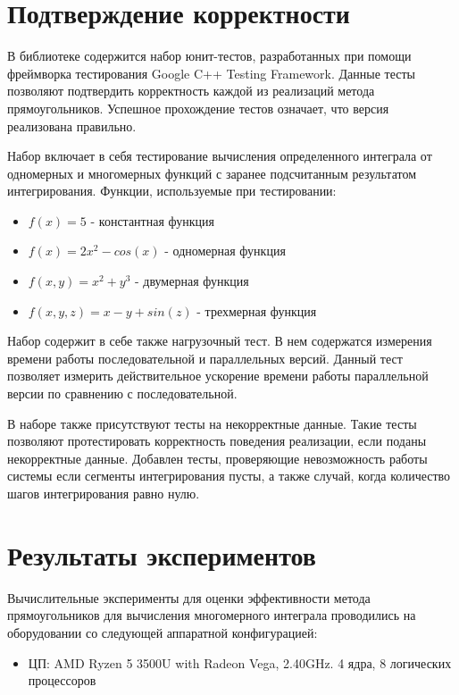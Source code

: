 \documentclass{report}
\begin{document}
\section*{Подтверждение корректности}
В библиотеке содержится набор юнит-тестов, разработанных при помощи фреймворка тестирования Google C++ Testing Framework. Данные тесты позволяют подтвердить корректность каждой из реализаций метода прямоугольников. Успешное прохождение тестов означает, что версия реализована правильно.
\par Набор включает в себя тестирование вычисления определенного интеграла от одномерных и многомерных функций с заранее подсчитанным результатом интегрирования. Функции, используемые при тестировании:
\begin{itemize}
\item $f(x)=5$ - константная функция
\item $f(x)=2x^2 - cos(x)$ - одномерная функция
\item $f(x,y)=x^2 + y^3$ - двумерная функция
\item $f(x,y,z)=x - y + sin(z)$ - трехмерная функция
\end{itemize}

\par Набор содержит в себе также нагрузочный тест. В нем содержатся измерения времени работы последовательной и параллельных версий. Данный тест позволяет измерить действительное ускорение времени работы параллельной версии по сравнению с последовательной.
\par В наборе также присутствуют тесты на некорректные данные. Такие тесты позволяют протестировать корректность поведения реализации, если поданы некорректные данные. Добавлен тесты, проверяющие невозможность работы системы если сегменты интегрирования пусты, а также случай, когда количество шагов интегрирования равно нулю.

\newpage

\section*{Результаты экспериментов}
Вычислительные эксперименты для оценки эффективности метода прямоугольников для вычисления многомерного интеграла проводились на оборудовании со следующей аппаратной конфигурацией:

\begin{itemize}
\item ЦП: AMD Ryzen 5 3500U with Radeon Vega, 2.40GHz. 4 ядра, 8 логических процессоров
\end{itemize}
\end{document}
